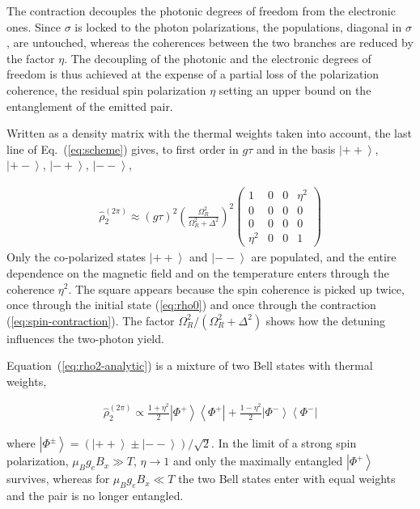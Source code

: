 \documentclass[prb,twocolumn,preprintnumbers,superscriptaddress]{revtex4-2}
\begin{document}
The contraction decouples the photonic degrees of freedom from the electronic ones.
Since $\sigma$ is locked to the photon polarizations, the populations, diagonal in
$\sigma$, are untouched, whereas the coherences between the two branches are reduced by the factor $\eta$.
The decoupling of the photonic and the electronic degrees of freedom is thus achieved at the expense
of a partial loss of the polarization coherence, the residual spin polarization $\eta$
setting an upper bound on the entanglement of the emitted pair.

Written as a density matrix with the thermal weights taken into account, the last
line of Eq.~(\ref{eq:scheme}) gives, to first order in $g \tau$ and in the basis
$\left| + + \right>$, $\left| + - \right>$, $\left| - + \right>$,
$\left| - - \right>$,

\begin{gather}
    \hat{\rho}_2^{(2\pi)} \approx \left( g \tau \right)^2
    \left( \frac{\Omega_R^2}{\Omega_R^2 + \Delta^2} \right)^2
    \begin{pmatrix}
        1 & 0 & 0 & \eta^2 \\
        0 & 0 & 0 & 0 \\
        0 & 0 & 0 & 0 \\
        \eta^2 & 0 & 0 & 1
    \end{pmatrix}
    \label{eq:rho2-analytic}
\end{gather}
Only the co-polarized states $\left| + + \right>$ and $\left| - - \right>$ are
populated, and the entire dependence on the magnetic field and on the temperature
enters through the coherence $\eta^2$.
The square appears because the spin coherence is picked up twice, once through the
initial state (\ref{eq:rho0}) and once through the contraction
(\ref{eq:spin-contraction}).
The factor $\Omega_R^2 / ( \Omega_R^2 + \Delta^2 )$ shows how the detuning influences
the two-photon yield.

Equation~(\ref{eq:rho2-analytic}) is a mixture of two Bell states with thermal
weights,

\begin{gather}
    \hat{\rho}_2^{(2\pi)} \propto \frac{1 + \eta^2}{2}
    \left| \Phi^+ \right> \left< \Phi^+ \right|
    + \frac{1 - \eta^2}{2}
    \left| \Phi^- \right> \left< \Phi^- \right|
    \label{eq:bell-mixture}
\end{gather}

where $\left| \Phi^{\pm} \right> = ( \left| + + \right> \pm
\left| - - \right> ) / \sqrt{2}$.
In the limit of a strong spin polarization, $\mu_B g_e B_x \gg T$,
$\eta \rightarrow 1$ and only the maximally entangled $\left| \Phi^+ \right>$
survives, whereas for $\mu_B g_e B_x \ll T$ the two Bell states enter with equal
weights and the pair is no longer entangled.
\end{document}
